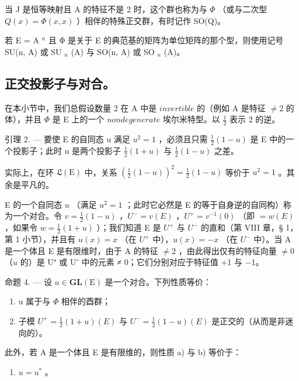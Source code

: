 当 J 是恒等映射且 A 的特征不是 2 时，这个群也称为与 \(\Phi\) （或与二次型 \(Q(x) = \Phi(x, x)\) ）相伴的特殊正交群，有时记作 SO(Q)。

若 E = A \(^{n}\) 且 Φ 是关于 E 的典范基的矩阵为单位矩阵的那个型，则使用记号 SU(n, A) 或 SU \(_{n}\) (A) 与 SO(n, A) 或 SO \(_{n}\) (A)。

\subsection{正交投影子与对合。}

在本小节中，我们总假设数量 2 在 A 中是 \(invertible\) 的（例如 A 是特征 \(\neq 2\) 的体），并且 \(\Phi\) 是 E 上的一个 \(nondegenerate\) 埃尔米特型。以 \(\frac{1}{2}\) 表示 2 的逆。

引理 2. --- 要使 E 的自同态 u 满足 \(u^{2}=1\) ，必须且只需 \(\frac{1}{2}(1-u)\) 是 E 中的一个投影子；此时 u 是两个投影子 \(\frac{1}{2}(1+u)\) 与 \(\frac{1}{2}(1-u)\) 之差。

实际上，在环 \(\mathfrak{L}(\mathrm{E})\) 中，关系 \(\left(\frac{1}{2}(1 - u)\right)^2 = \frac{1}{2}(1 - u)\) 等价于 \(u^2 = 1\) 。其余是平凡的。

E 的一个自同态 \(u\) （满足 \(u^2 = 1\) ；此时它必然是 E 的等于自身逆的自同构）称为一个对合。令 \(v = \frac{1}{2}(1 - u)\) ，\(U^- = v(E)\) ，\(U^+ = v^{-1}(0)\) （即 \(= w(E)\) ，如果令 \(w = \frac{1}{2}(1 + u)\) ）；我们知道 E 是 \(U^+\) 与 \(U^-\) 的直和（第 VIII 章，§ 1，第 1 小节），并且有 \(u(x) = x\) （在 \(U^+\) 中），\(u(x) = -x\) （在 \(U^-\) 中）。当 A 是一个体且 E 是有限维时，由于 A 的特征 \(\neq 2\) ，由此得出仅有的特征向量 \(\neq 0\) （\(u\) 的）是 U⁺ 或 U⁻ 中的元素 ≠ 0；它们分别对应于特征值 +1 与 −1。

命题 4. --- 设 \(u \in \mathbf{GL}(\mathrm{E})\) 是一个对合。下列性质等价：

\begin{enumerate}
\def\labelenumi{\alph{enumi})}
\item
  u 属于与 \(\Phi\) 相伴的酉群；
\item
  子模 \(U^{+} = \frac{1}{2}(1 + u)(E)\) 与 \(U^{-} = \frac{1}{2}(1 - u)(E)\) 是正交的（从而是非迷向的）。
\end{enumerate}

此外，若 A 是一个体且 E 是有限维的，则性质 a) 与 b) 等价于：

\begin{enumerate}
\def\labelenumi{\alph{enumi})}
\setcounter{enumi}{2}
\tightlist
\item
  \(u = u^{*}\) 。
\end{enumerate}

